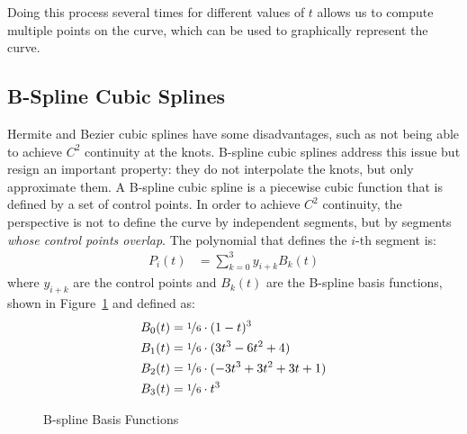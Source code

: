 Doing this process several times for different values of $t$ allows us to compute multiple points on the curve, which can be used to graphically represent the curve.


\subsection{B-Spline Cubic Splines}

Hermite and Bezier cubic splines have some disadvantages, such as not being able to achieve $C^2$ continuity at the knots. B-spline cubic splines address this issue but resign an important property: they do not interpolate the knots, but only approximate them. A B-spline cubic spline is a piecewise cubic function that is defined by a set of control points. In order to achieve $C^2$ continuity, the perspective is not to define the curve by independent segments, but by segments \emph{whose control points overlap}. The polynomial that defines the $i$-th segment is:
\begin{align*}
    P_i(t) &= \sum_{k=0}^{3} y_{i+k} B_k(t)
\end{align*}
where $y_{i+k}$ are the control points and $B_k(t)$ are the B-spline basis functions, shown in Figure~\ref{fig:bspline_basis} and defined as:
\begin{align*}
    B_0(t) &= \nicefrac{1}{6}\cdot (1 - t)^3 \\
    B_1(t) &= \nicefrac{1}{6}\cdot (3t^3 - 6t^2 + 4) \\
    B_2(t) &= \nicefrac{1}{6}\cdot (-3t^3 + 3 t^2 + 3t + 1) \\
    B_3(t) &= \nicefrac{1}{6}\cdot t^3
\end{align*}
\begin{figure}
    \centering
    \caption{B-spline Basis Functions}
    \label{fig:bspline_basis}
\end{figure}


